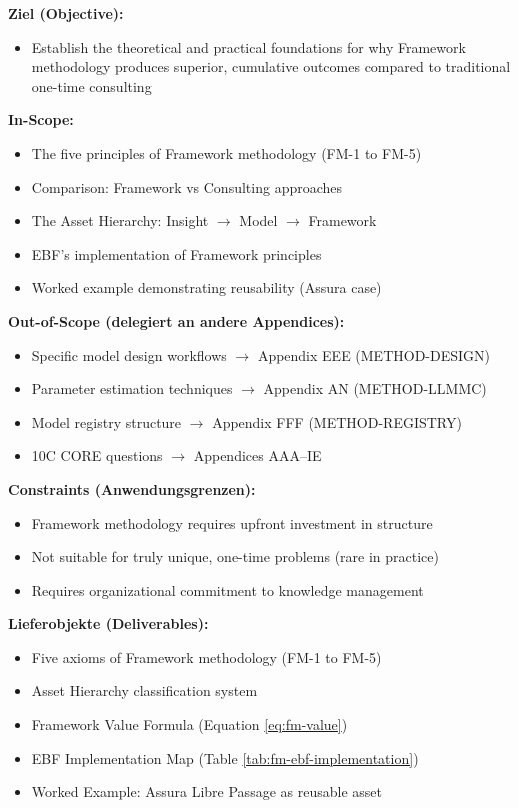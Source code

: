 \begin{tcolorbox}[
    colback=orange!5!white,
    colframe=orange!75!black,
    title={\textbf{Appendix Scope: Ziel / In-Scope / Out-of-Scope / Constraints}},
    fonttitle=\bfseries
]

\textbf{Ziel (Objective):}
\begin{itemize}[nosep]
    \item Establish the theoretical and practical foundations for why Framework methodology produces superior, cumulative outcomes compared to traditional one-time consulting
\end{itemize}

\textbf{In-Scope:}
\begin{itemize}[nosep]
    \item The five principles of Framework methodology (FM-1 to FM-5)
    \item Comparison: Framework vs Consulting approaches
    \item The Asset Hierarchy: Insight $\to$ Model $\to$ Framework
    \item EBF's implementation of Framework principles
    \item Worked example demonstrating reusability (Assura case)
\end{itemize}

\textbf{Out-of-Scope (delegiert an andere Appendices):}
\begin{itemize}[nosep]
    \item Specific model design workflows $\rightarrow$ Appendix EEE (METHOD-DESIGN)
    \item Parameter estimation techniques $\rightarrow$ Appendix AN (METHOD-LLMMC)
    \item Model registry structure $\rightarrow$ Appendix FFF (METHOD-REGISTRY)
    \item 10C CORE questions $\rightarrow$ Appendices AAA--IE
\end{itemize}

\textbf{Constraints (Anwendungsgrenzen):}
\begin{itemize}[nosep]
    \item Framework methodology requires upfront investment in structure
    \item Not suitable for truly unique, one-time problems (rare in practice)
    \item Requires organizational commitment to knowledge management
\end{itemize}

\textbf{Lieferobjekte (Deliverables):}
\begin{itemize}[nosep]
    \item Five axioms of Framework methodology (FM-1 to FM-5)
    \item Asset Hierarchy classification system
    \item Framework Value Formula (Equation \ref{eq:fm-value})
    \item EBF Implementation Map (Table \ref{tab:fm-ebf-implementation})
    \item Worked Example: Assura Libre Passage as reusable asset
\end{itemize}

\end{tcolorbox}


